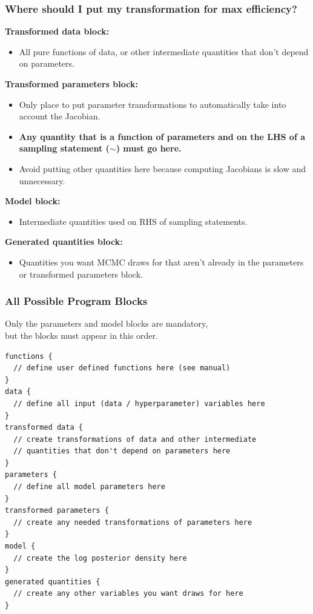 \documentclass[xcolor=dvipsnames]{beamer}
\begin{document}
\begin{frame}[fragile]
\frametitle{Where should I put my transformation for max efficiency?}
\textbf{Transformed data block:}
\begin{itemize}
\item All pure functions of data, or other intermediate quantities that don't depend on parameters.
\end{itemize}
\textbf{Transformed parameters block:}
\begin{itemize}
\item Only place to put parameter transformations to automatically take into account the Jacobian.
\item \textbf{\color{red}Any quantity that is a function of parameters and on the LHS of a sampling statement ($\sim$) must go here.}
\item Avoid putting other quantities here because computing Jacobians is slow and unnecessary.
\end{itemize}
\textbf{Model block:}
\begin{itemize}
\item Intermediate quantities used on RHS of sampling statements.
\end{itemize}
\textbf{Generated quantities block:}
\begin{itemize}
\item Quantities you want MCMC draws for that aren't already in the parameters or transformed parameters block.
\end{itemize}
\end{frame}

\begin{frame}[fragile]
\frametitle{All Possible Program Blocks}
Only the parameters and model blocks are mandatory,\\
but the blocks must appear in this order.
{\tiny
\begin{verbatim}
functions {
  // define user defined functions here (see manual)
}
data {
  // define all input (data / hyperparameter) variables here
}
transformed data {
  // create transformations of data and other intermediate
  // quantities that don't depend on parameters here
}
parameters {
  // define all model parameters here
}
transformed parameters {
  // create any needed transformations of parameters here
}
model {
  // create the log posterior density here
}
generated quantities {
  // create any other variables you want draws for here
}
\end{verbatim}}
\end{frame}
\end{document}

